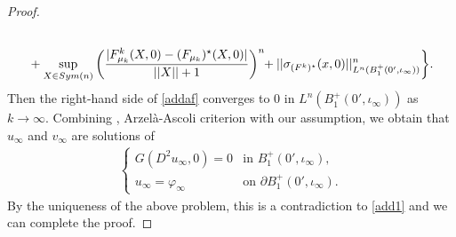 \documentclass[11pt, reqno]{amsart}
\numberwithin{equation}{section}
\begin{document}
\begin{proof}
\begin{align*}
 \\ & \quad + \sup_{X \in Sym(n)} \bigg( \frac{|F_{\mu_{k}}^{k}(X,0)-(F_{\mu_{k}})^{\star}(X,0)|}{||X||+1} \bigg)^{n} \hspace{-0.3em} + ||\sigma_{(F^{k})^{\star}}(x,0)||_{L^{n}(B_{1}^{+}(0',\iota_{\infty}))}^{n}\bigg\}.
\end{align*}
Then the right-hand side of \eqref{addaf} converges to $0$ in $L^{n}(B_{1}^{+}(0',\iota_{\infty}))$ as $k\to\infty$.
Combining \cite[Proposition 1.5]{MR2486925}, Arzel\`{a}-Ascoli criterion with our assumption, we obtain that $u_{\infty}$ and $v_{\infty}$ are solutions of
\begin{align*}
\left\{ \begin{array}{ll}
G(D^{2}u_{\infty},0) = 0 & \textrm{in $B_{1}^{+}(0',\iota_{\infty}), $}\\
u_{\infty}=\varphi_{\infty} & \textrm{on $\partial B_{1}^{+}(0',\iota_{\infty})$}.
\end{array} \right.
\end{align*}
By the uniqueness of the above problem, this is a contradiction to \eqref{add1} and we can complete the proof.
\end{proof}
\end{document}
